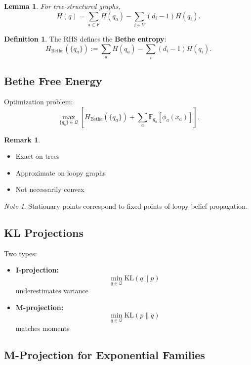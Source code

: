 \documentclass[12pt,oneside]{book}
\numberwithin{equation}{section}
\theoremstyle{definition}
\newtheorem{definition}{Definition}[section]
\newtheorem{remark}{Remark}[section]
\theoremstyle{plain}
\newtheorem{lemma}{Lemma}[section]
\theoremstyle{remark}
\newtheorem*{note}{Note}
\newcommand{\E}{\mathbb{E}}
\begin{document}
\begin{lemma}
For tree-structured graphs,
\[
H(q)
=
\sum_{a \in F} H(q_a)
-
\sum_{i \in V} (d_i - 1) H(q_i).
\]
\end{lemma}

\begin{definition}
The RHS defines the \textbf{Bethe entropy}:
\[
H_{\text{Bethe}}(\{q_a\}) := \sum_a H(q_a) - \sum_i (d_i - 1) H(q_i).
\]
\end{definition}

\subsection{Bethe Free Energy}

Optimization problem:
\[
\max_{\{q_a\} \in \mathcal{Q}}
\left[
H_{\text{Bethe}}(\{q_a\})
+
\sum_a \E_{q_a}[\phi_a(x_a)]
\right].
\]

\begin{remark}
\begin{itemize}
    \item Exact on trees
    \item Approximate on loopy graphs
    \item Not necessarily convex
\end{itemize}
\end{remark}

\begin{note}
Stationary points correspond to fixed points of loopy belief propagation.
\end{note}

\subsection{KL Projections}

Two types:

\begin{itemize}
    \item \textbf{I-projection:}
    \[
    \min_{q \in \mathcal{Q}} \mathrm{KL}(q \| p)
    \]
    underestimates variance
    
    \item \textbf{M-projection:}
    \[
    \min_{q \in \mathcal{Q}} \mathrm{KL}(p \| q)
    \]
    matches moments
\end{itemize}

\subsection{M-Projection for Exponential Families}
\end{document}
